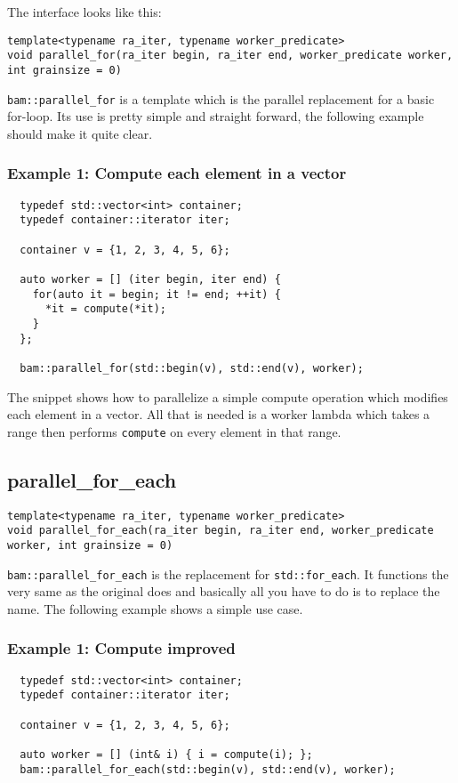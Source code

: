 \documentclass[11pt, a4paper]{article}
\begin{document}
The interface looks like this:

\begin{lstlisting} 
template<typename ra_iter, typename worker_predicate>
void parallel_for(ra_iter begin, ra_iter end, worker_predicate worker, int grainsize = 0)
\end{lstlisting}
\texttt{bam::parallel\_for} is a template which is the parallel replacement for a basic for-loop. Its use is pretty simple and straight forward, the following example should make it quite clear.

\subsubsection{Example 1: Compute each element in a vector}

\begin{lstlisting} 
  typedef std::vector<int> container;
  typedef container::iterator iter;

  container v = {1, 2, 3, 4, 5, 6};

  auto worker = [] (iter begin, iter end) {
    for(auto it = begin; it != end; ++it) {
      *it = compute(*it);
    }
  };

  bam::parallel_for(std::begin(v), std::end(v), worker);
\end{lstlisting}
The snippet shows how to parallelize a simple compute operation which modifies each element in a vector. All that is needed is a worker lambda which takes a range then performs \texttt{compute} on every element in that range. 

\subsection{parallel\_for\_each}
\begin{lstlisting}
template<typename ra_iter, typename worker_predicate>
void parallel_for_each(ra_iter begin, ra_iter end, worker_predicate worker, int grainsize = 0)
\end{lstlisting}

\texttt{bam::parallel\_for\_each} is the replacement for \texttt{std::for\_each}. It functions the very same as the original does and basically all you have to do is to replace the name. The following example shows a simple use case.

\subsubsection{Example 1: Compute improved}
\begin{lstlisting}
  typedef std::vector<int> container;
  typedef container::iterator iter;

  container v = {1, 2, 3, 4, 5, 6};

  auto worker = [] (int& i) { i = compute(i); };
  bam::parallel_for_each(std::begin(v), std::end(v), worker);
\end{lstlisting}
\end{document}
